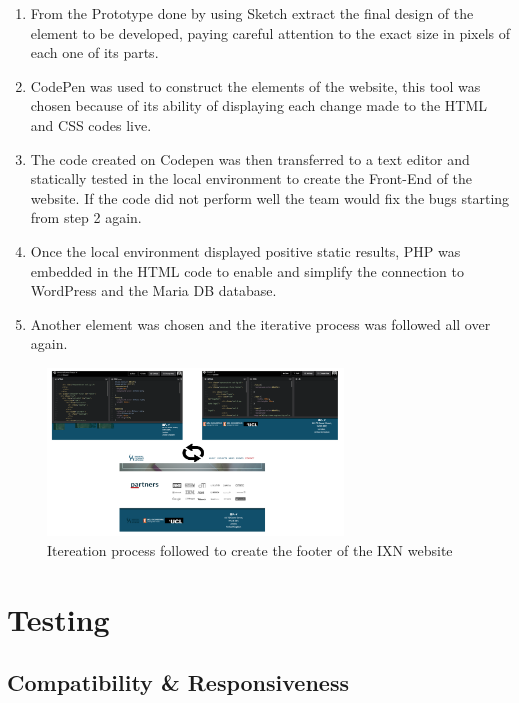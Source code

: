 \documentclass[fontsize=10pt]{extarticle}
\numberwithin{figure}{section} %
\providecommand{\tightlist}{%
  \setlength{\itemsep}{0pt}\setlength{\parskip}{0pt}}
\begin{document}
\begin{enumerate}

\tightlist
\item
  From the Prototype done by using Sketch extract the final design of
  the element to be developed, paying careful attention to the exact
  size in pixels of each one of its parts.
\item
  CodePen was used to construct the elements of the website, this tool
  was chosen because of its ability of displaying each change made to
  the HTML and CSS codes live.\\
\item
  The code created on Codepen was then transferred to a text editor and
  statically tested in the local environment to create the Front-End of
  the website. If the code did not perform well the team would fix the
  bugs starting from step 2 again.
\item
  Once the local environment displayed positive static results, PHP was
  embedded in the HTML code to enable and simplify the connection to
  WordPress and the Maria DB database.
\item
  Another element was chosen and the iterative process was followed all
  over again.
\end{enumerate}

\begin{figure}[H]
      \centering
      \includegraphics[trim = 0 0 0 0, clip, width=0.7\textwidth]{ph21.png}
      \caption{Itereation process followed to create the footer of the IXN website}
 \end{figure}

\hypertarget{testing}{%
\section{Testing}\label{testing}}

\hypertarget{compatibility-responsiveness}{%
\subsection{Compatibility \&
Responsiveness}\label{compatibility-responsiveness}}
\end{document}

